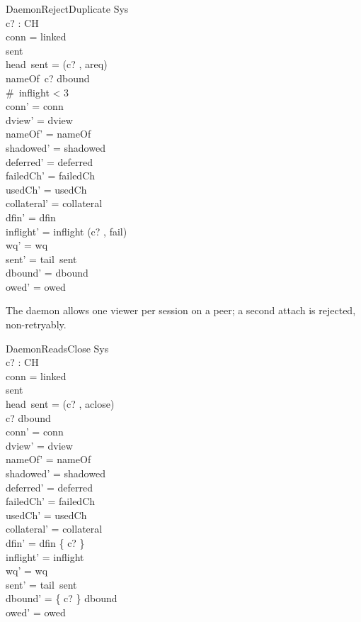\documentclass[a4paper,10pt,fleqn]{article}
\begin{document}
\begin{schema}{DaemonRejectDuplicate}
  \Delta Sys \\
  c? : CH \\
\where
  conn = linked \\
  sent \neq \langle \rangle \\
  head~sent = (c? , areq) \\
  nameOf~c? \in \ran dbound \\
  \#~inflight < 3 \\
  conn' = conn \\
  dview' = dview \\
  nameOf' = nameOf \\
  shadowed' = shadowed \\
  deferred' = deferred \\
  failedCh' = failedCh \\
  usedCh' = usedCh \\
  collateral' = collateral \\
  dfin' = dfin \\
  inflight' = inflight \cat \langle (c? , fail) \rangle \\
  wq' = wq \\
  sent' = tail~sent \\
  dbound' = dbound \\
  owed' = owed
\end{schema}

The daemon allows one viewer per session on a peer; a second attach is rejected, non-retryably.

\begin{schema}{DaemonReadsClose}
  \Delta Sys \\
  c? : CH \\
\where
  conn = linked \\
  sent \neq \langle \rangle \\
  head~sent = (c? , aclose) \\
  c? \in \dom dbound \\
  conn' = conn \\
  dview' = dview \\
  nameOf' = nameOf \\
  shadowed' = shadowed \\
  deferred' = deferred \\
  failedCh' = failedCh \\
  usedCh' = usedCh \\
  collateral' = collateral \\
  dfin' = dfin \setminus \{ c? \} \\
  inflight' = inflight \\
  wq' = wq \\
  sent' = tail~sent \\
  dbound' = \{ c? \} \ndres dbound \\
  owed' = owed
\end{schema}
\end{document}
